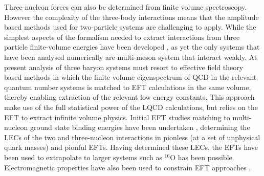 Three-nucleon forces can also be determined from finite volume spectroscopy.  However the complexity of the three-body interactions means that the amplitude based methods used for two-particle systems are challenging to apply. While the simplest aspects of the formalism needed to extract interactions from three particle finite-volume energies have been developed \cite{Beane:2007qr,Detmold:2008gh,Tan:2007bg,SharpeETC}, as yet the only systems that have been analysed numerically are multi-meson system that interact weakly. At present analysis of three baryon systems must resort to  effective field theory based methods \cite{Detmold:2012wpa,Detmold:2013wda,Detmold:2015jda,Kirscher:2015tka,Davoudi:2017ddj,Savage:2016egr} in which the finite volume eigenspectrum of QCD in the relevant quantum number systems is matched to EFT calculations in the same volume, thereby enabling extraction of the relevant low energy constants. This approach make use of the full statistical power of the LQCD calculations, but relies on the EFT to extract infinite volume physics. Initial EFT studies matching to multi-nucleon ground state binding energies have been undertaken \cite{Barnea:2013uqa,Bansal:2017pwn,Contessi:2017rww,Gandolfi:2017arm}, determining the LECs of the two and three-nucleon interactions in pionless (at a set of unphysical quark masses) and pionful EFTs. Having determined these LECs, the EFTs have been used to extrapolate to larger systems such as $^{16}$O has been possible. Electromagnetic properties have also been used to constrain EFT approaches \cite{Kirscher:2017fqc}.




